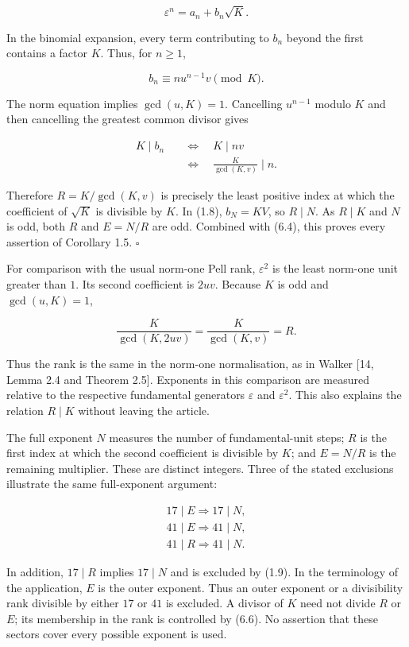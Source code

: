 \documentclass[11pt,a4paper]{article}
\begin{document}
\[
\varepsilon^n=a_n+b_n\sqrt K.
\]

In the binomial expansion, every term contributing to \(b_n\) beyond the
first contains a factor \(K\). Thus, for \(n\ge1\),

\[
b_n\equiv n u^{n-1}v\pmod K.
\tag{6.5}
\]

The norm equation implies \(\gcd(u,K)=1\). Cancelling \(u^{n-1}\) modulo
\(K\) and then cancelling the greatest common divisor gives

\[
\begin{aligned}
K\mid b_n
&\quad\Longleftrightarrow\quad K\mid nv\\
&\quad\Longleftrightarrow\quad
\frac{K}{\gcd(K,v)}\mid n.
\end{aligned}
\tag{6.6}
\]

Therefore \(R=K/\gcd(K,v)\) is precisely the least positive index at
which the coefficient of \(\sqrt K\) is divisible by \(K\). In (1.8),
\(b_N=KV\), so \(R\mid N\). As \(R\mid K\) and \(N\) is odd, both \(R\)
and \(E=N/R\) are odd. Combined with (6.4), this proves every assertion
of Corollary 1.5. \(\square\)

For comparison with the usual norm-one Pell rank, \(\varepsilon^2\) is
the least norm-one unit greater than \(1\). Its second coefficient is
\(2uv\). Because \(K\) is odd and \(\gcd(u,K)=1\),

\[
\frac{K}{\gcd(K,2uv)}
=\frac{K}{\gcd(K,v)}=R.
\tag{6.7}
\]

Thus the rank is the same in the norm-one normalisation, as in Walker
{[}14, Lemma 2.4 and Theorem 2.5{]}. Exponents in this comparison are
measured relative to the respective fundamental generators
\(\varepsilon\) and \(\varepsilon^2\). This also explains the relation
\(R\mid K\) without leaving the article.

The full exponent \(N\) measures the number of fundamental-unit steps;
\(R\) is the first index at which the second coefficient is divisible by
\(K\); and \(E=N/R\) is the remaining multiplier. These are distinct
integers. Three of the stated exclusions illustrate the same
full-exponent argument:

\[
\begin{gathered}
17\mid E\Rightarrow17\mid N,\\
41\mid E\Rightarrow41\mid N,\\
41\mid R\Rightarrow41\mid N.
\end{gathered}
\tag{6.8}
\]

In addition, \(17\mid R\) implies \(17\mid N\) and is excluded by (1.9).
In the terminology of the application, \(E\) is the outer exponent. Thus
an outer exponent or a divisibility rank divisible by either \(17\) or
\(41\) is excluded. A divisor of \(K\) need not divide \(R\) or \(E\);
its membership in the rank is controlled by (6.6). No assertion that
these sectors cover every possible exponent is used.
\end{document}
